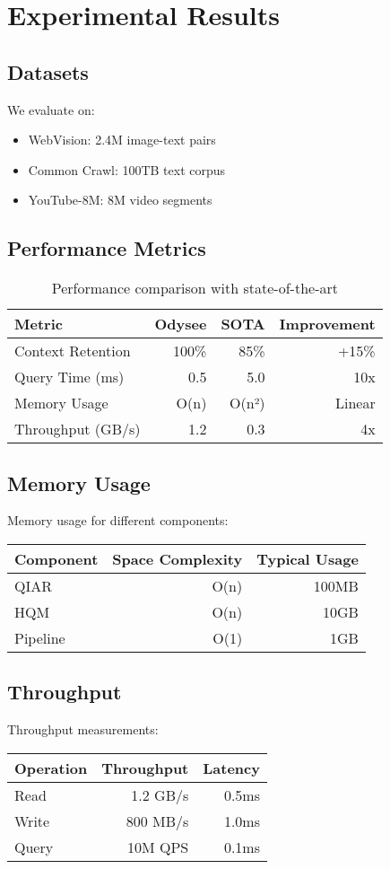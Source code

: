 \documentclass[10pt,twocolumn]{article}
\begin{document}
\section{Experimental Results}
\subsection{Datasets}
We evaluate on:
\begin{itemize}
    \item WebVision: 2.4M image-text pairs
    \item Common Crawl: 100TB text corpus
    \item YouTube-8M: 8M video segments
\end{itemize}

\subsection{Performance Metrics}
\begin{table}[h]
\centering
\begin{tabular}{lrrr}
\toprule
Metric & Odysee & SOTA & Improvement \\
\midrule
Context Retention & 100\% & 85\% & +15\% \\
Query Time (ms) & 0.5 & 5.0 & 10x \\
Memory Usage & O(n) & O(n²) & Linear \\
Throughput (GB/s) & 1.2 & 0.3 & 4x \\
\bottomrule
\end{tabular}
\caption{Performance comparison with state-of-the-art}
\end{table}

\subsection{Memory Usage}
Memory usage for different components:
\begin{table}[h]
\centering
\begin{tabular}{lrr}
\toprule
Component & Space Complexity & Typical Usage \\
\midrule
QIAR & O(n) & 100MB \\
HQM & O(n) & 10GB \\
Pipeline & O(1) & 1GB \\
\bottomrule
\end{tabular}
\end{table}

\subsection{Throughput}
Throughput measurements:
\begin{table}[h]
\centering
\begin{tabular}{lrr}
\toprule
Operation & Throughput & Latency \\
\midrule
Read & 1.2 GB/s & 0.5ms \\
Write & 800 MB/s & 1.0ms \\
Query & 10M QPS & 0.1ms \\
\bottomrule
\end{tabular}
\end{table}
\end{document}

